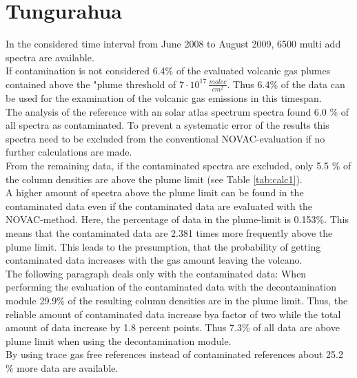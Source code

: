 \documentclass  [
  paper    = a4,
  BCOR     = 10mm,
  twoside,
  fontsize = 12pt,
  fleqn,
  toc      = bibnumbered,
  toc      = listofnumbered,
  numbers  = noendperiod,
  headings = normal,
  listof   = leveldown,
  version  = 3.03
]                                       {scrreprt}
\begin{document}
\section{Tungurahua}
	In the considered time interval from June 2008 to August 2009, 6500 multi add spectra are available. \\
	If contamination is not considered
	6.4\% of the evaluated volcanic gas plumes contained  above the "plume threshold of $7\cdot10^{17}\,\frac{molec}{cm^2}$. Thus 6.4\% of the data can be used for the examination of the volcanic gas emissions in this timespan.\\
 	The analysis of the reference with an solar atlas spectrum spectra found 6.0 \% of all spectra as contaminated. To prevent a systematic error of the results this spectra need to be excluded from the conventional NOVAC-evaluation if no further calculations are made.\\
 	From the remaining data,  if the contaminated spectra are excluded, only 5.5 \% of the   column densities are above the plume limit  (see  Table \ref{tab:calc1}). \\
 	A higher amount of spectra above the   plume limit can be found in the contaminated data even if the contaminated data are evaluated with the NOVAC-method. Here, the percentage of data in the plume-limit is 0.153\%.
 	This means that the contaminated data are 2.381 times more frequently above the plume limit. This leads to the presumption, that the probability of getting contaminated data increases with the gas amount leaving the volcano.\\
 	The following paragraph deals only with the contaminated data:	
 	When performing the evaluation of the contaminated data with the decontamination module 29.9\% of the resulting   column densities are in the plume limit. Thus, the reliable amount of contaminated data increase bya factor of two while the total amount of data increase by 1.8 percent points. Thus 7.3\% of all data are above plume limit when using the decontamination module.\\
 	By using trace gas free references instead of contaminated references about 25.2 \% more data are available. \\

	
\end{document}
